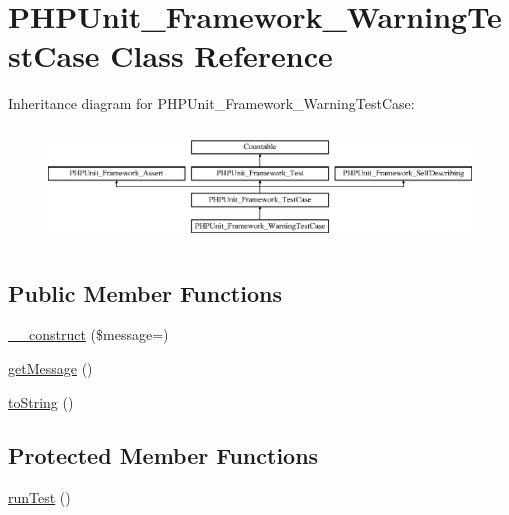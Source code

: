 \hypertarget{class_p_h_p_unit___framework___warning_test_case}{}\section{P\+H\+P\+Unit\+\_\+\+Framework\+\_\+\+Warning\+Test\+Case Class Reference}
\label{class_p_h_p_unit___framework___warning_test_case}
Inheritance diagram for P\+H\+P\+Unit\+\_\+\+Framework\+\_\+\+Warning\+Test\+Case\+:\begin{figure}[H]
\begin{center}
\leavevmode
\includegraphics[height=3.085400cm]{class_p_h_p_unit___framework___warning_test_case}
\end{center}
\end{figure}
\subsection*{Public Member Functions}
\begin{DoxyCompactItemize}
\item 
\mbox{\hyperlink{class_p_h_p_unit___framework___warning_test_case_a8300e53307a88a2940196a76ff6c7bfb}{\+\_\+\+\_\+construct}} (\$message=\textquotesingle{}\textquotesingle{})
\item 
\mbox{\hyperlink{class_p_h_p_unit___framework___warning_test_case_a0b0e611236742aac18ba1936d03ba89a}{get\+Message}} ()
\item 
\mbox{\hyperlink{class_p_h_p_unit___framework___warning_test_case_a5558c5d549f41597377fa1ea8a1cefa3}{to\+String}} ()
\end{DoxyCompactItemize}
\subsection*{Protected Member Functions}
\begin{DoxyCompactItemize}
\item 
\mbox{\hyperlink{class_p_h_p_unit___framework___warning_test_case_ad2541a093be4d619db04ed65d661a684}{run\+Test}} ()
\end{DoxyCompactItemize}
